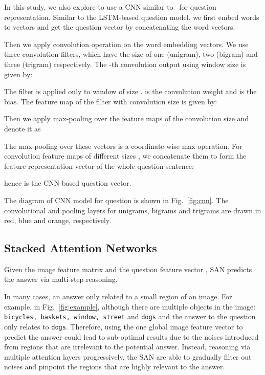 \documentclass[10pt,twocolumn,letterpaper]{article}
\begin{document}
In this study, we also explore to use a CNN similar
to~\cite{kim2014convolutional} for question representation. Similar to the
LSTM-based question model, we first embed words to vectors 
and get the question vector by concatenating the word vectors:

Then we apply convolution operation on the word embedding vectors. We use three
convolution filters, which have the size of one (unigram), two (bigram) and
three (trigram) respectively. The -th convolution output using window size
 is given by:

The filter is applied only to window  of size .  is the
convolution weight and  is the bias. The feature map of the filter with
convolution size  is given by:


Then we apply max-pooling over the feature maps of the convolution size  and
denote it as

The max-pooling over these vectors is a coordinate-wise max operation.  For
convolution feature maps of different sizes , we concatenate them
to form the feature representation vector of the whole question sentence:

hence  is the CNN based question vector.

The diagram of CNN model for question is shown in Fig.~\ref{fig:cnn}. The
convolutional and pooling layers for unigrams, bigrams and trigrams are drawn
in red, blue and orange, respectively.

\subsection{Stacked Attention Networks}
\label{sec:deep_attention_network}

Given the image feature matrix  and the question feature vector ,
SAN predicts the answer via multi-step reasoning.

In many cases, an answer only related to a small region of an image. For
example, in Fig.~\ref{fig:example}, although there are multiple objects in the
image: \texttt{bicycles, baskets, window, street} and \texttt{dogs} and the
answer to the question only relates to \texttt{dogs}. Therefore, using the one
global image feature vector to predict the answer could lead to sub-optimal
results due to the noises introduced from regions that are irrelevant to the
potential answer. Instead, reasoning via multiple attention layers
progressively, the SAN are able to gradually filter out noises and pinpoint the
regions that are highly relevant to the answer.
\end{document}
